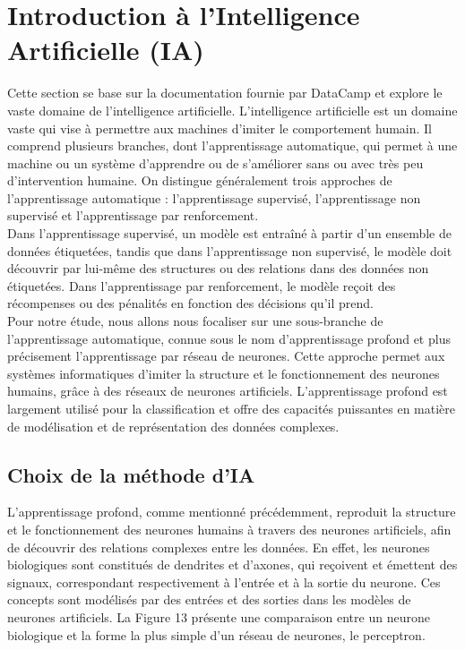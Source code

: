 \section{Introduction à l'Intelligence Artificielle (IA)}

Cette section se base sur la documentation fournie par DataCamp \cite{datacamp} et explore le vaste domaine de l'intelligence artificielle. L'intelligence artificielle est un domaine vaste qui vise à permettre aux machines d'imiter le comportement humain. Il comprend plusieurs branches, dont l'apprentissage automatique, qui permet à une machine ou un système d'apprendre ou de s'améliorer sans ou avec très peu d'intervention humaine. On distingue généralement trois approches de l'apprentissage automatique : l'apprentissage supervisé, l'apprentissage non supervisé et l'apprentissage par renforcement. \\

\noindent Dans l'apprentissage supervisé, un modèle est entraîné à partir d'un ensemble de données étiquetées, tandis que dans l'apprentissage non supervisé, le modèle doit découvrir par lui-même des structures ou des relations dans des données non étiquetées. Dans l'apprentissage par renforcement, le modèle reçoit des récompenses ou des pénalités en fonction des décisions qu'il prend. \\


\noindent Pour notre étude, nous allons nous focaliser sur une sous-branche de l'apprentissage automatique, connue sous le nom d'apprentissage profond et plus précisement l'apprentissage par réseau de neurones. Cette approche permet aux systèmes informatiques d'imiter la structure et le fonctionnement des neurones humains, grâce à des réseaux de neurones artificiels. L'apprentissage profond est largement utilisé pour la classification et offre des capacités puissantes en matière de modélisation et de représentation des données complexes.

\subsection{Choix de la méthode d'IA}

L'apprentissage profond, comme mentionné précédemment, reproduit la structure et le fonctionnement des neurones humains à travers des neurones artificiels, afin de découvrir des relations complexes entre les données. En effet, les neurones biologiques sont constitués de dendrites et d'axones, qui reçoivent et émettent des signaux, correspondant respectivement à l'entrée et à la sortie du neurone. Ces concepts sont modélisés par des entrées et des sorties dans les modèles de neurones artificiels. La Figure 13 présente une comparaison entre un neurone biologique et la forme la plus simple d'un réseau de neurones, le perceptron. \\

